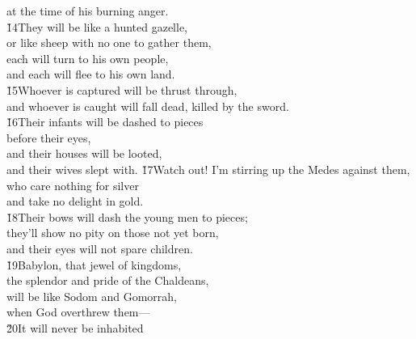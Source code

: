 \begin{poetry}
\poemll    at the time of his burning anger. \\
\poeml \v{14}They will be like a hunted gazelle, \\
\poemll    or like sheep with no one to gather them, \\
\poeml each will turn to his own people, \\
\poemll    and each will flee to his own land. \\
\poeml \v{15}Whoever is captured will be thrust through, \\
\poemll    and whoever is caught will fall dead, killed by the sword. \\
\poeml \v{16}Their infants will be dashed to pieces \\
\poemll    before their eyes, \\
\poeml and their houses will be looted, \\
\poemll    and their wives slept with.
\poeml \v{17}Watch out! I'm stirring up the Medes against them, \\
\poemll    who care nothing for silver \\
\poemlll       and take no delight in gold. \\
\poeml \v{18}Their bows will dash the young men to pieces; \\
\poemll    they'll show no pity on those not yet born, \\
\poemlll       and their eyes will not spare children. \\
\poeml \v{19}Babylon, that jewel of kingdoms, \\
\poemll    the splendor and pride of the Chaldeans, \\
\poeml will be like Sodom and Gomorrah, \\
\poemll    when God overthrew them--- \\
\poeml \v{20}It will never be inhabited \\

\end{poetry}
